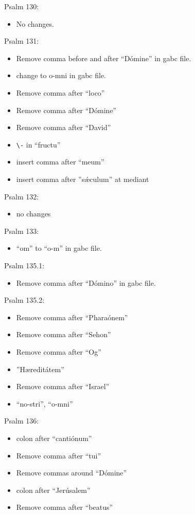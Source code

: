 \documentclass[11pt]{article}
\begin{document}
  Psalm 130:
  \begin{itemize}
  \item 
No changes.
    \end{itemize}
  
      Psalm 131:
  \begin{itemize}
  \item Remove comma before and after ``Dómine'' in gabc file.
  \item
 change to o-mni  in gabc file.
  \item   Remove comma after ``loco''
  \item
  Remove comma after ``Dómine''
    \item
  Remove comma after ``David''
  \item
 \verb|\-| in ``fructu''
 \item insert comma after ``meum''
 \item insert comma after ''sǽculum'' at mediant
    \end{itemize}

Psalm 132:
  \begin{itemize}
  \item 
no changes
    \end{itemize}

 Psalm 133:
  \begin{itemize}
  \item 
``om'' to ``o-m'' in gabc file.
    \end{itemize}

Psalm 135.1:
  \begin{itemize}
  \item Remove comma after ``Dómino'' in gabc file.
    \end{itemize}

Psalm 135.2:
  \begin{itemize}
  \item Remove comma after ``Pharaónem''
  \item  Remove comma after ``Sehon''
   \item Remove comma after ``Og''
   \item ''Hæreditátem''
     \item Remove comma after ``Israel''
     \item
     ``no-stri'', ``o-mni''
    \end{itemize}

Psalm 136:
  \begin{itemize}
  \item colon after ``cantiónum''
    \item  Remove comma after ``tui''
    \item
    Remove commas around ``Dómine''
  \item  colon after ``Jerúsalem''
  \item
  Remove comma after ``beatus''
    \end{itemize}
\end{document}
